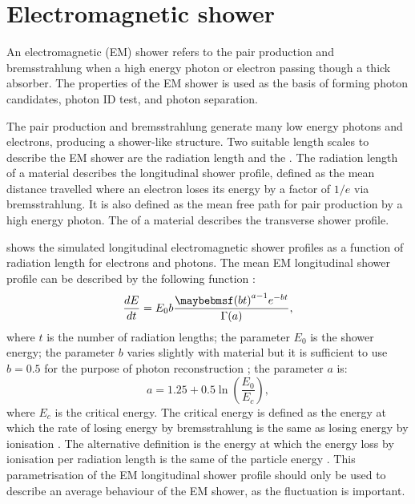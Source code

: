 

\section{Electromagnetic shower}
\label{sec:photonEMshower}
An electromagnetic (EM) shower refers to the pair production and bremsstrahlung when a high energy photon or electron passing though a thick absorber. The properties of the EM shower is used as the basis of forming photon candidates, photon ID test, and photon separation.

The pair production and bremsstrahlung generate many low energy photons and electrons, producing a shower-like  structure. Two suitable length scales to describe the EM shower are the radiation length and the \RM. The radiation length of a material describes the longitudinal shower profile, defined as the mean distance travelled where an electron loses its energy by a factor of $1/e$ via bremsstrahlung. It is also defined as the mean free path  for pair production by a high energy photon\cite{segre1977nuclei}. The \RM of a material describes the transverse shower profile.


 shows the simulated longitudinal electromagnetic shower profiles as a function of radiation length for electrons and photons. The mean EM longitudinal shower profile can be described by the following function \cite{Longo:1975wb} :
\begin{equation}
\frac{dE}{dt} = E_0 b \frac{\parenths{bt}^{a-1}e^{-bt}}{\Gamma(a)},
\label{eq:photonEMshower}
\end{equation}
where $t$ is the number of radiation lengths; the parameter $E_0$ is the shower energy; the parameter $b$ varies slightly with material but it is sufficient to use $b = 0.5$ for the purpose of photon reconstruction \cite{Agashe:2014kda}; the parameter $a$ is:
\begin{equation}
a = 1.25 + 0.5\ln\left(\frac{E_0}{E_c}\right),
\end{equation}
where $E_c$ is the critical energy. The critical energy is defined as the energy at which the rate of losing energy by bremsstrahlung is the same as losing energy by ionisation \cite{1964NASSP3012.....B}. The alternative definition is the energy at which the energy loss by ionisation per radiation length is the same of the particle energy \cite{rossi1952high}. This parametrisation of the EM longitudinal shower profile should only be used to describe an average behaviour of the EM shower, as the fluctuation is important.

